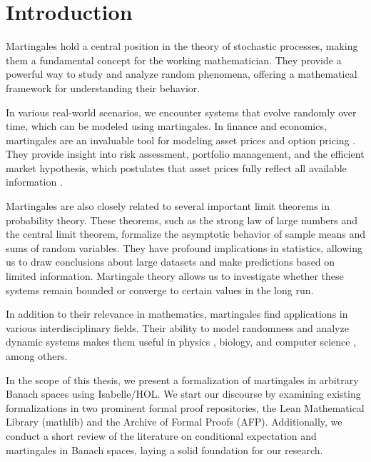 ﻿%

\chapter{Introduction}\label{chapter:introduction}

Martingales hold a central position in the theory of stochastic processes, making them a fundamental concept for the working mathematician. They provide a powerful way to study and analyze random phenomena, offering a mathematical framework for understanding their behavior. 

In various real-world scenarios, we encounter systems that evolve randomly over time, which can be modeled using martingales. In finance and economics, martingales are an invaluable tool for modeling asset prices \cite{fama1965} and option pricing \cite{Musiela_Rutkowski_2005}. They provide insight into risk assessment, portfolio management, and the efficient market hypothesis, which postulates that asset prices fully reflect all available information \cite{yaes1989}. 

Martingales are also closely related to several important limit theorems in probability theory. These theorems, such as the strong law of large numbers and the central limit theorem, formalize the asymptotic behavior of sample means and sums of random variables. They have profound implications in statistics, allowing us to draw conclusions about large datasets and make predictions based on limited information. Martingale theory allows us to investigate whether these systems remain bounded or converge to certain values in the long run.

In addition to their relevance in mathematics, martingales find applications in various interdisciplinary fields. Their ability to model randomness and analyze dynamic systems makes them useful in physics \cite{roldan2023}, biology, and computer science \cite{mitzenmacher_upfal_2005}, among others.

In the scope of this thesis, we present a formalization of martingales in arbitrary Banach spaces using Isabelle/HOL. We start our discourse by examining existing formalizations in two prominent formal proof repositories, the Lean Mathematical Library (\textsf{mathlib}) and the Archive of Formal Proofs (\textsf{AFP}). Additionally, we conduct a short review of the literature on conditional expectation and martingales in Banach spaces, laying a solid foundation for our research.

